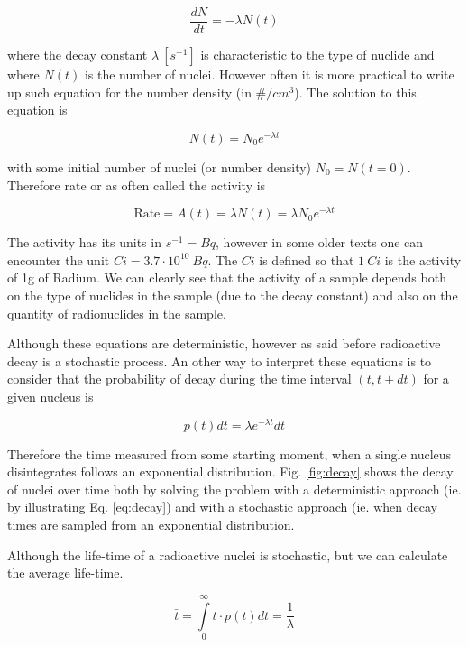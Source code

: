 \begin{equation}
\frac{dN}{dt}=-\lambda N(t)
\end{equation}

\noindent where the decay constant $\lambda \: [s^{-1}]$ is characteristic to the type of nuclide and where $N(t)$ is the number of nuclei. However often it is more practical to write up such equation for the number density (in $\#/cm^3$). The solution to this equation is

\begin{equation}\label{eq:decay}
N(t)=N_0e^{-\lambda t}
\end{equation}

\noindent with some initial number of nuclei (or number density) $N_0=N(t=0)$. Therefore rate or as often called the activity is

\begin{equation}
\text{Rate}=A(t)=\lambda N(t)=\lambda N_0e^{-\lambda t}
\end{equation}

The activity has its units in $s^{-1}=Bq$, however in some older texts one can encounter the unit $Ci=3.7 \cdot 10^{10}\: Bq$. The $Ci$ is defined so that $1 \: Ci$ is the activity of 1g of Radium. We can clearly see that the activity of a sample depends both on the type of nuclides in the sample (due to the decay constant) and also on the quantity of radionuclides in the sample.

Although these equations are deterministic, however as said before radioactive decay is a stochastic process. An other way to interpret these equations is to consider that the probability of decay during the time interval $(t,t+dt)$ for a given nucleus is

\begin{equation}
p(t)dt=\lambda e^{-\lambda t}dt
\end{equation}

Therefore the time measured from some starting moment, when a single nucleus disintegrates follows an exponential distribution. Fig. \ref{fig:decay} shows the decay of nuclei over time both by solving the problem with a deterministic approach (ie. by illustrating Eq. \eqref{eq:decay}) and with a stochastic approach (ie. when decay times are sampled from an exponential distribution. 

Although the life-time of a radioactive nuclei is stochastic, but we can calculate the average life-time.

\begin{equation}
\bar{t}=\int\limits_0^\infty{t\cdot p(t) dt}=\frac{1}{\lambda}
\end{equation}

